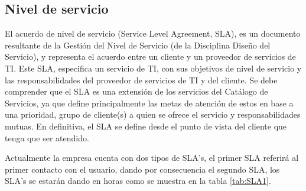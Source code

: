 \subsection{Nivel de servicio}
El acuerdo de nivel de servicio (Service Level Agreement, SLA), es un documento resultante de la Gestión del Nivel de Servicio (de la Disciplina Diseño del Servicio), y representa el acuerdo entre un cliente y un proveedor de servicios de TI. Este SLA, especifica un servicio de TI, con sus objetivos de nivel de servicio y las responsabilidades del proveedor de servicios de TI y del cliente. Se debe comprender que el SLA es una extensión de los servicios del Catálogo de Servicios, ya que define principalmente las metas de atención de estos en base a una prioridad, grupo de cliente(s) a quien se ofrece el servicio y responsabilidades mutuas. En definitiva, el SLA se define desde el punto de vista del cliente que tenga que ser atendido.

Actualmente la empresa cuenta con dos tipos de SLA’s, el primer SLA referirá al primer contacto con el usuario, dando por consecuencia el segundo SLA, los SLA’s se estarán dando en horas como se muestra en la tabla \ref{tab:SLA1}.


\begin{table}[H]
	\centering
	\caption{Niveles de SLA}

%
\end{table}%

